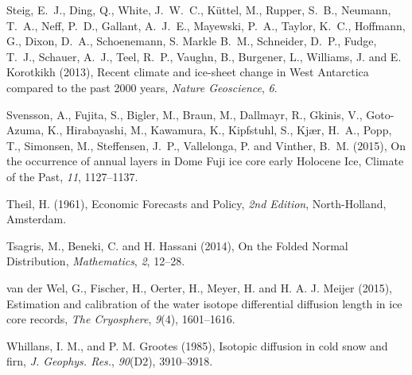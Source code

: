 \documentclass[draft, jgrga]{AGUTeX}
\begin{document}
\begin{article}
\begin{thebibliography}{}
Steig, E.~J., Ding, Q., White, J.~W.~C., Küttel, M., Rupper, S.~B., Neumann, T.~A., Neff, P.~D., Gallant, A.~J.~E., Mayewski, P.~A.,
Taylor, K.~C., Hoffmann, G., Dixon, D.~A., Schoenemann, S. Markle B.~M., Schneider, D.~P., Fudge, T.~J.,
Schauer, A.~J., Teel, R.~P., Vaughn, B., Burgener, L., Williams, J. and E. Korotkikh (2013),
{Recent climate and ice-sheet change in West Antarctica compared to the past 2000 years},
\textit{Nature Geoscience}, \textit{6}.

Svensson, A., Fujita, S., Bigler, M., Braun, M., Dallmayr, R., Gkinis, V.,
Goto-Azuma, K., Hirabayashi, M., Kawamura, K., Kipfstuhl, S., Kjær, H.~A.,
Popp, T., Simonsen, M., Steffensen, J.~P., Vallelonga, P. and Vinther, B.~M. (2015),
{On the occurrence of annual layers in Dome Fuji ice core early Holocene Ice},
{Climate of	the Past}, \textit{11}, 1127--1137.

Theil, H. (1961),
{Economic Forecasts and Policy},
\textit{2nd Edition}, North-Holland, Amsterdam.

Tsagris, M., Beneki, C. and H. Hassani (2014),
{On the Folded Normal Distribution},
\textit{Mathematics}, \textit{2}, 12--28.

van der Wel, G., Fischer, H., Oerter, H., Meyer, H. and H. A. J. Meijer (2015),
Estimation and calibration of the water isotope differential diffusion length in ice core records,
\textit{The Cryosphere}, \textit{9}(4), 1601--1616.

Whillans, I. M., and P. M. Grootes (1985),
Isotopic diffusion in cold snow and firn,
\textit{J. Geophys. Res.}, \textit{90}(D2), 3910--3918.


\end{thebibliography}




\end{article}
\end{document}
